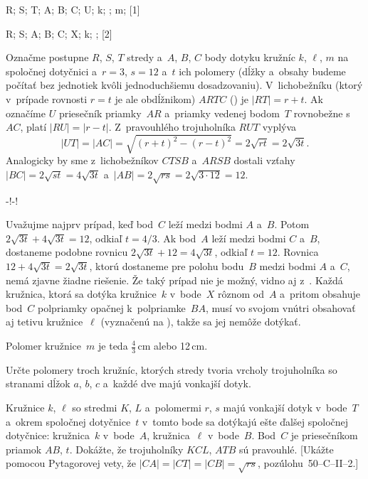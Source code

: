 {%
\fontplace
\lpoint R; \rpoint S; \rpoint T;
\tpoint A; \tpoint B; \tpoint C;
\lpoint U;
\lBpoint k; \lBpoint \ell; \rBpoint m;
[1] \hfil\Obr

\fontplace
\lpoint R; \rpoint S; 
\tpoint A; \tpoint B; \tpoint C; \brpoint X;
\rBpoint k; \bpoint \ell; 
[2] \hfil\Obr

Označme postupne $R$, $S$, $T$ stredy a~$A$, $B$, $C$ body
dotyku kružníc $k$, $\ell$, $m$ na spoločnej dotyčnici a~$r=3$,
$s=12$ a~$t$ ich polomery (dĺžky a~obsahy budeme počítať 
bez jednotiek kvôli jednoduchšiemu dosadzovaniu). V~lichobežníku (ktorý 
v~prípade rovnosti $r=t$ je ale obdĺžnikom) $ARTC$ (\obr) je $|RT|=r+t$.
Ak označíme $U$ priesečník priamky~$AR$ a~priamky vedenej
bodom~$T$ rovnobežne s~$AC$, platí $|RU|=|r-t|$. Z~pravouhlého
trojuholníka $RUT$ vyplýva
$$|UT|=|AC|=\sqrt{(r+t)^2-(r-t)^2}=2\sqrt{rt}=2\sqrt{3t}.$$
Analogicky by sme z~lichobežníkov $CTSB$ a~$ARSB$ dostali vzťahy
$|BC|=2\sqrt{st}=4\sqrt{3t}$ a~$|AB|=2\sqrt{rs}=2\sqrt{3\cdot12}=12$.
\midinsert
\centerline{\inspicture-!\hss\inspicture-!}
\endinsert

Uvažujme najprv prípad, keď bod~$C$ leží medzi bodmi $A$ a~$B$. Potom
$2\sqrt{3t} + 4\sqrt{3t} = 12$, odkiaľ $t=4/3$. Ak
bod~$A$ leží medzi bodmi $C$ a~$B$, dostaneme podobne rovnicu
$2\sqrt{3t} +12= 4\sqrt{3t}$, odkiaľ $t=12$. Rovnica
$12+4\sqrt{3t}=2\sqrt{3t}$, ktorú dostaneme pre polohu
bodu~$B$ medzi bodmi $A$ a~$C$, nemá zjavne žiadne riešenie. Že taký
prípad nie je možný, vidno aj z~\obr. Každá kružnica, 
ktorá sa dotýka kružnice~$k$ v~bode~$X$ rôznom od~$A$ 
a~pritom obsahuje bod~$C$ polpriamky opačnej k~polpriamke~$BA$, musí 
vo svojom vnútri obsahovať aj tetivu kružnice~$\ell$ (vyznačenú na ), 
takže sa jej nemôže dotýkať.

Polomer kružnice~$m$ je teda $\frac43$\,cm alebo 12\,cm.
  

Určte polomery troch kružníc, ktorých stredy tvoria vrcholy
trojuholníka so stranami dĺžok $a$, $b$, $c$ a~každé dve majú
vonkajší dotyk.

Kružnice $k$, $\ell$ so stredmi $K$, $L$ a~polomermi $r$, $s$ majú
vonkajší dotyk v~bode~$T$ a~okrem spoločnej dotyčnice~$t$ v~tomto bode
sa dotýkajú ešte ďalšej spoločnej dotyčnice: kružnica~$k$ v~bode~$A$,
kružnica~$\ell$ v~bode~$B$. Bod~$C$ je priesečníkom priamok $AB$, $t$.
Dokážte, že trojuholníky $KCL$, $ATB$ sú pravouhlé. [Ukážte
pomocou Pytagorovej vety, že $|CA|=|CT|=|CB|=\sqrt{rs}$, poz\.
úlohu~50--C--II--2.]
}

